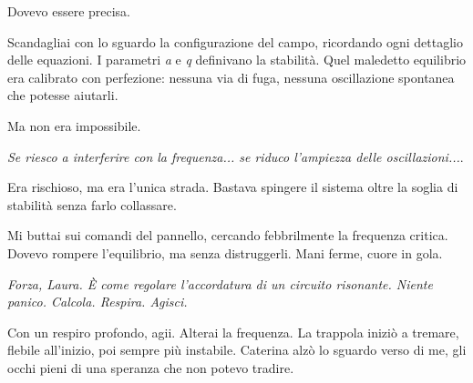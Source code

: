 Dovevo essere precisa.

Scandagliai con lo sguardo la configurazione del campo, ricordando ogni dettaglio delle equazioni. I parametri \textit{a} e \textit{q} definivano la stabilità. Quel maledetto equilibrio era calibrato con perfezione: nessuna via di fuga, nessuna oscillazione spontanea che potesse aiutarli.

Ma non era impossibile.

\textit{Se riesco a interferire con la frequenza... se riduco l'ampiezza delle oscillazioni...}.

Era rischioso, ma era l'unica strada. Bastava spingere il sistema oltre la soglia di stabilità senza farlo collassare.

Mi buttai sui comandi del pannello, cercando febbrilmente la frequenza critica. Dovevo rompere l’equilibrio, ma senza distruggerli. Mani ferme, cuore in gola.

\textit{Forza, Laura. È come regolare l'accordatura di un circuito risonante. Niente panico. Calcola. Respira. Agisci.}  

\begin{center}
\begin{minipage}{0.7\textwidth}
    \centering
\end{minipage}
\end{center}
Con un respiro profondo, agii. Alterai la frequenza. La trappola iniziò a tremare, flebile all’inizio, poi sempre più instabile.
Caterina alzò lo sguardo verso di me, gli occhi pieni di una speranza che non potevo tradire.

